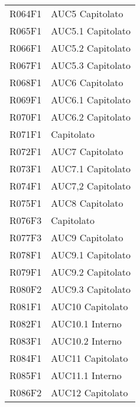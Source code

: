 \documentclass[../analisi-dei-requisiti.tex]{subfiles}
\begin{document}
\begin{longtable}[H]{ p{4cm} | p{4cm} }
  R064F1                               & AUC5 Capitolato               \\
  R065F1                               & AUC5.1 Capitolato             \\
  R066F1                               & AUC5.2 Capitolato             \\
  R067F1                               & AUC5.3 Capitolato             \\
  R068F1                               & AUC6 Capitolato               \\
  R069F1                               & AUC6.1 Capitolato             \\
  R070F1                               & AUC6.2 Capitolato             \\
  R071F1                               & Capitolato                    \\
  R072F1                               & AUC7 Capitolato               \\
  R073F1                               & AUC7.1 Capitolato             \\
  R074F1                               & AUC7,2 Capitolato             \\
  R075F1                               & AUC8 Capitolato               \\
  R076F3                               & Capitolato                    \\
  R077F3                               & AUC9 Capitolato               \\
  R078F1                               & AUC9.1 Capitolato             \\
  R079F1                               & AUC9.2 Capitolato             \\
  R080F2                               & AUC9.3 Capitolato             \\
  R081F1                               & AUC10 Capitolato              \\
  R082F1                               & AUC10.1 Interno               \\
  R083F1                               & AUC10.2 Interno               \\
  R084F1                               & AUC11 Capitolato              \\
  R085F1                               & AUC11.1 Interno               \\
  R086F2                               & AUC12 Capitolato              \\

\end{longtable}
\end{document}

